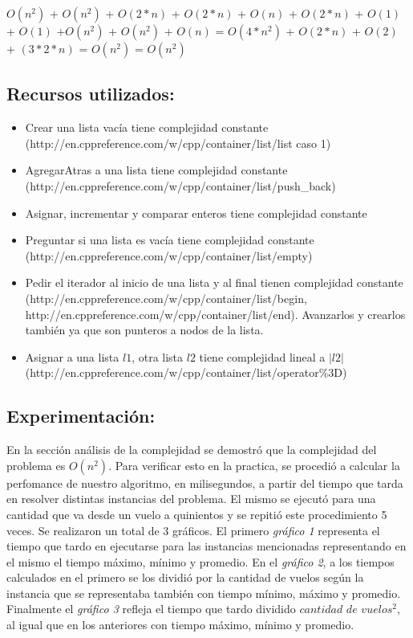 \documentclass[a4paper]{article}
\begin{document}
$O(n^{2})$ + $O(n^{2})$ + $O(2*n)$ + $O(2*n)$ + $O(n)$ + $O(2*n)$ + $O(1)$ + $O(1)$ +$O(n^{2})$ + $O(n^{2})$ + $O(n)$  = $O(4*n^{2})$ + $O(2*n)$ + $O(2)$ + $(3*2*n)$ = $O(n^{2})$ =  $O(n^{2})$
\subsection{Recursos utilizados:}
\begin{itemize}
\item Crear una lista vacía tiene complejidad constante \newline (http://en.cppreference.com/w/cpp/container/list/list caso 1)
\item AgregarAtras a una lista tiene complejidad constante 
\newline (http://en.cppreference.com/w/cpp/container/list/push\_back)
\item Asignar, incrementar y comparar enteros tiene complejidad constante
\item Preguntar si una lista es vacía tiene complejidad constante \newline (http://en.cppreference.com/w/cpp/container/list/empty)
\item Pedir el iterador al inicio de una lista y al final tienen complejidad constante \newline (http://en.cppreference.com/w/cpp/container/list/begin, http://en.cppreference.com/w/cpp/container/list/end). Avanzarlos y crearlos también ya que son punteros a nodos de la lista. 
\item Asignar a una lista $l1$, otra lista $l2$ tiene complejidad lineal a $|l2|$ \newline (http://en.cppreference.com/w/cpp/container/list/operator\%3D)
\end{itemize}

\subsection{Experimentación:}


En la sección análisis de la complejidad se demostró que la complejidad del problema es $O(n^{2})$. Para verificar esto en la practica, se procedió a calcular la perfomance de nuestro algoritmo, en milisegundos, a partir del tiempo que tarda en resolver distintas instancias del problema. El mismo se ejecutó para una cantidad que va desde un vuelo a quinientos y se repitió este procedimiento 5 veces. Se realizaron un total de 3 gráficos. El primero \textit{gráfico 1} representa el tiempo que tardo en ejecutarse para las instancias mencionadas representando en el  mismo el tiempo máximo, mínimo y promedio. En el \textit{gráfico 2}, a los tiempos calculados en el primero se los dividió por la cantidad de vuelos según la instancia que se representaba también con tiempo mínimo, máximo y promedio. Finalmente el \textit{gráfico 3} refleja el tiempo que tardo dividido  $cantidad$ $de$ $vuelos^{2}$, al igual que en los anteriores con tiempo máximo, mínimo y promedio.   
\end{document}
